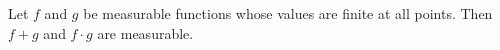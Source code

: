 Let $f$ and $g$ be measurable functions whose values are finite at all points. Then $f + g$ and $f \cdot g$ are measurable.
